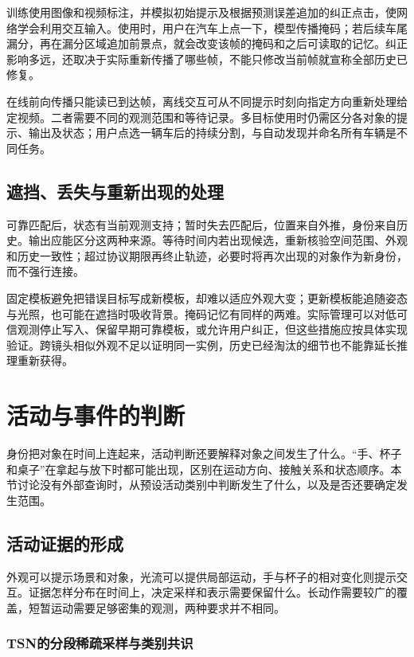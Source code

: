 训练使用图像和视频标注，并模拟初始提示及根据预测误差追加的纠正点击，使网络学会利用交互输入。使用时，用户在汽车上点一下，模型传播掩码；若后续车尾漏分，再在漏分区域追加前景点，就会改变该帧的掩码和之后可读取的记忆。纠正影响多远，还取决于实际重新传播了哪些帧，不能只修改当前帧就宣称全部历史已修复。

在线前向传播只能读已到达帧，离线交互可从不同提示时刻向指定方向重新处理给定视频。二者需要不同的观测范围和等待记录。多目标使用时仍需区分各对象的提示、输出及状态；用户点选一辆车后的持续分割，与自动发现并命名所有车辆是不同任务。

\subsection{遮挡、丢失与重新出现的处理}
\label{sec:vision-video-recovery}

可靠匹配后，状态有当前观测支持；暂时失去匹配后，位置来自外推，身份来自历史。输出应能区分这两种来源。等待时间内若出现候选，重新核验空间范围、外观和历史一致性；超过协议期限再终止轨迹，必要时将再次出现的对象作为新身份，而不强行连接。

固定模板避免把错误目标写成新模板，却难以适应外观大变；更新模板能追随姿态与光照，也可能在遮挡时吸收背景。掩码记忆有同样的两难。实际管理可以对低可信观测停止写入、保留早期可靠模板，或允许用户纠正，但这些措施应按具体实现验证。跨镜头相似外观不足以证明同一实例，历史已经淘汰的细节也不能靠延长推理重新获得。

\section{活动与事件的判断}
\label{sec:vision-video-activities}

身份把对象在时间上连起来，活动判断还要解释对象之间发生了什么。“手、杯子和桌子”在拿起与放下时都可能出现，区别在运动方向、接触关系和状态顺序。本节讨论没有外部查询时，从预设活动类别中判断发生了什么，以及是否还要确定发生范围。

\subsection{活动证据的形成}
\label{sec:vision-video-activity-evidence}

外观可以提示场景和对象，光流可以提供局部运动，手与杯子的相对变化则提示交互。证据怎样分布在时间上，决定采样和表示需要保留什么。长动作需要较广的覆盖，短暂运动需要足够密集的观测，两种要求并不相同。

\subsubsection{TSN的分段稀疏采样与类别共识}
\label{sec:vision-video-tsn}

